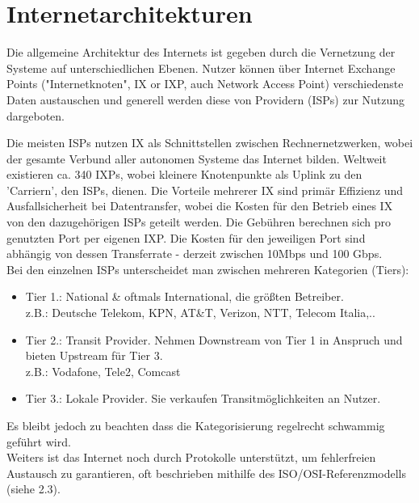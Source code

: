 \documentclass[11pt]{article}
\begin{document}
    \section{Internetarchitekturen}
    Die allgemeine Architektur des Internets ist gegeben durch die Vernetzung der
    Systeme auf unterschiedlichen Ebenen.  Nutzer können über Internet Exchange Points
    ("Internetknoten", IX or IXP, auch Network Access Point) verschiedenste Daten
    austauschen und generell werden diese von Providern (ISPs) zur Nutzung dargeboten.

    Die meisten ISPs nutzen IX als Schnittstellen zwischen Rechnernetzwerken, wobei der
    gesamte Verbund aller autonomen Systeme das Internet bilden. Weltweit existieren ca.
    340 IXPs, wobei kleinere Knotenpunkte als Uplink zu den 'Carriern', den ISPs, dienen.
    Die Vorteile mehrerer IX sind primär Effizienz und Ausfallsicherheit bei Datentransfer, wobei
    die Kosten für den Betrieb eines IX von den dazugehörigen ISPs geteilt werden. Die Gebühren
    berechnen sich pro genutzten Port per eigenen IXP. Die Kosten für den jeweiligen Port sind
    abhängig von dessen Transferrate - derzeit zwischen 10Mbps und 100 Gbps.\\

    \noindent Bei den einzelnen ISPs unterscheidet man zwischen mehreren Kategorien (Tiers):
    \begin{itemize}
    \item Tier 1.: National \& oftmals International, die größten Betreiber. \\
    z.B.: Deutsche Telekom, KPN, AT\&T, Verizon, NTT, Telecom Italia,..
    \item Tier 2.: Transit Provider. Nehmen Downstream von Tier 1 in Anspruch und bieten Upstream für Tier 3.\\
    z.B.: Vodafone, Tele2, Comcast
    \item Tier 3.: Lokale Provider. Sie verkaufen Transitmöglichkeiten an Nutzer.
    \end{itemize}
    \noindent Es bleibt jedoch zu beachten dass die Kategorisierung regelrecht schwammig geführt wird.\\

    \noindent Weiters ist das Internet noch durch Protokolle unterstützt, um fehlerfreien Austausch
    zu garantieren, oft beschrieben mithilfe des ISO/OSI-Referenzmodells (siehe 2.3).
\end{document}
